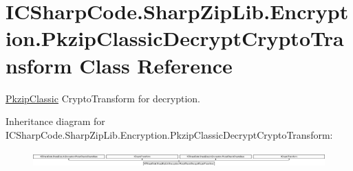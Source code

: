 \hypertarget{class_i_c_sharp_code_1_1_sharp_zip_lib_1_1_encryption_1_1_pkzip_classic_decrypt_crypto_transform}{}\section{I\+C\+Sharp\+Code.\+Sharp\+Zip\+Lib.\+Encryption.\+Pkzip\+Classic\+Decrypt\+Crypto\+Transform Class Reference}
\label{class_i_c_sharp_code_1_1_sharp_zip_lib_1_1_encryption_1_1_pkzip_classic_decrypt_crypto_transform}


\hyperlink{class_i_c_sharp_code_1_1_sharp_zip_lib_1_1_encryption_1_1_pkzip_classic}{Pkzip\+Classic} Crypto\+Transform for decryption.  


Inheritance diagram for I\+C\+Sharp\+Code.\+Sharp\+Zip\+Lib.\+Encryption.\+Pkzip\+Classic\+Decrypt\+Crypto\+Transform\+:\begin{figure}[H]
\begin{center}
\leavevmode
\includegraphics[height=0.622222cm]{class_i_c_sharp_code_1_1_sharp_zip_lib_1_1_encryption_1_1_pkzip_classic_decrypt_crypto_transform}
\end{center}
\end{figure}
